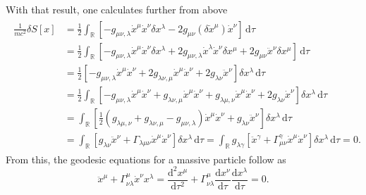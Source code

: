 \documentclass[a4paper,11pt]{article}
\numberwithin{equation}{section}
\begin{document}
{\begin{align}
\begin{aligned}
\end{aligned}
\end{align} With that result, one calculates further from above \begin{align}
\begin{aligned}
\frac{1}{mc^2}\delta S[x] &= \frac{1}{2}\int_{\mathbb{R}}\left[-g_{\mu\nu,\lambda}\dot{x}^\mu\dot{x}^\nu\delta x^\lambda-2g_{\mu\nu}(\delta \dot{x}^\mu)\dot{x}^\nu\right]\,\mathrm{d}\tau \\
&= \frac{1}{2}\int_{\mathbb{R}}\left[-g_{\mu\nu,\lambda}\dot{x}^\mu\dot{x}^\nu\delta x^\lambda + 2g_{\mu\nu,\lambda}\dot{x}^\lambda\dot{x}^\nu\delta x^\mu+2g_{\mu\nu}\ddot{x}^\nu\delta x^\mu\right]\,\mathrm{d}\tau \\
&= \frac{1}{2}\left[-g_{\mu\nu,\lambda}\dot{x}^\mu\dot{x}^\nu+2g_{\lambda\nu,\mu}\dot{x}^\mu\dot{x}^\nu+2g_{\lambda\nu}\ddot{x}^\nu\right]\delta x^\lambda\,\mathrm{d}\tau \\
&= \frac{1}{2}\int_{\mathbb{R}}\left[-g_{\mu\nu,\lambda}\dot{x}^\mu\dot{x}^\nu+g_{\lambda\nu,\mu}\dot{x}^\mu\dot{x}^\nu+g_{\lambda\mu,\nu}\dot{x}^\mu\dot{x}^\nu+2g_{\lambda\nu}\dot{x}^\nu\right]\delta x^\lambda\,\mathrm{d}\tau \\
&=\int_{\mathbb{R}}\left[\frac{1}{2}\left(g_{\lambda\mu,\nu}+g_{\lambda\nu,\mu}-g_{\mu\nu,\lambda}\right)\dot{x}^\mu\dot{x}^\nu+g_{\lambda\nu}\ddot{x}^\nu\right]\delta x^\lambda\,\mathrm{d}\tau \\
&= \int_{\mathbb{R}} \left[g_{\lambda\nu}\ddot{x}^\nu+\Gamma_{\lambda\mu\nu}\dot{x}^\mu\dot{x}^\nu\right]\delta x^\lambda\,\mathrm{d}\tau = \int_{\mathbb{R}}g_{\lambda\gamma}\left[\ddot{x}^\gamma + \Gamma^{\gamma}_{\mu\nu}\dot{x}^\mu\dot{x}^\nu\right]\delta x^\lambda\,\mathrm{d}\tau = 0.
\end{aligned}
\end{align} From this, the geodesic equations for a massive particle follow as \begin{equation}
\ddot{x}^\mu + \Gamma^\mu_{\nu\lambda}\dot{x}^\nu x^\lambda = \frac{\mathrm{d}^2 x^\mu}{\mathrm{d}\tau^2} + \Gamma^\mu_{\nu\lambda} \frac{\mathrm{d}x^\nu}{\mathrm{d}\tau}\frac{\mathrm{d}x^\lambda}{\mathrm{d}\tau} = 0.
\end{equation}

}

\end{document}
